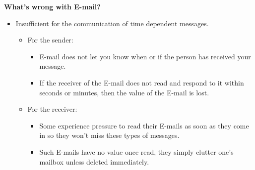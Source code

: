 \begin{slide}\Huge 
  {\bf What's wrong with E-mail?}  \horizontalline
  \begin{itemize}\huge
  \item Insufficient for the communication of time dependent messages.
    \begin{itemize}
    \item For the sender:
      \begin{itemize}
      \item E-mail does not let you know when or if the person has
        received your message.  \item If the receiver of the E-mail
        does not read and respond to it within seconds or minutes,
        then the value of the E-mail is lost.
      \end{itemize}
    \item For the receiver:
      \begin{itemize}
      \item Some experience pressure to read their E-mails as soon
        as they come in so they won't miss these types of messages.
      \item Such E-mails have no value once read, they simply
        clutter one's mailbox unless deleted immediately.
      \end{itemize}
    \end{itemize}
  \end{itemize}
\end{slide}


